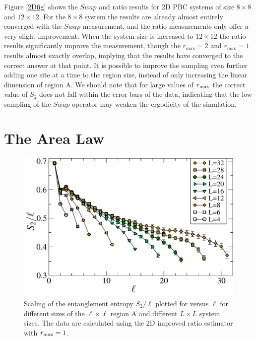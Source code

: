 Figure \ref{2Dfig} shows the $Swap$ and ratio results for 2D PBC systems of size $8 \times 8$ and $12 \times 12$.
For the $8\times 8$ system the results are already almost entirely converged with the $Swap$ measurement, and the ratio measurements only offer a very slight improvement.
	When the system size is increased to $12 \times 12$ the ratio results significantly improve the measurement, though the $r_{\max} = 2$ and $r_{\max} = 1$ results almost exactly overlap, implying that the results have converged to the correct answer at that point.
	It is possible to improve the sampling even further adding one site at a time to the region size, instead of only increasing the linear dimension of region A.
	We should note that for large values of $r_{\rm max}$ the correct value of $S_2$ does not fall within the error bars of the data, indicating that the low sampling of the $Swap$ operator may weaken the ergodicity of the simulation.

\section{The Area Law}

\begin{figure} {
	\includegraphics[width=5in]{./figures/paper2/fig_AreaL/fig4.pdf} 
	\centering
	\caption[Area law for $S_2$ in the N\'eel state]{
Scaling of the entanglement entropy $S_2/\ell$ plotted for versus $\ell$ for different sizes of the $\ell \times \ell$ region A and different $L \times L$ system sizes. 
The data are calculated using the 2D improved ratio estimator  with $r_{\rm max} = 1$.
	\label{2Darea}
	}
} \end{figure}


